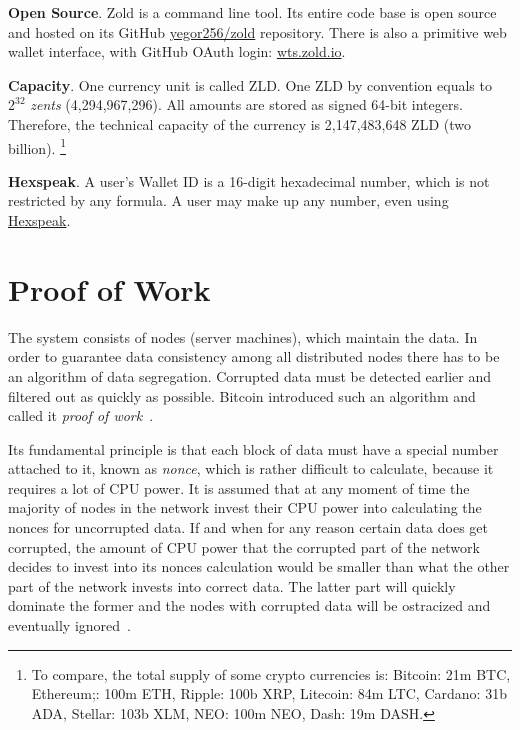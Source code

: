 \documentclass[11pt,oneside]{article}
\begin{document}
\textbf{Open Source}.
Zold is a command line tool. Its entire code base is open source
and hosted on its GitHub \href{https://github.com/yegor256/zold}{yegor256/zold}
repository. There is also a primitive web wallet interface, with
GitHub OAuth login: \href{https://wts.zold.io}{wts.zold.io}.

\textbf{Capacity}.
One currency unit is called ZLD.
One ZLD by convention equals to $2^{32}$ \emph{zents} (4,294,967,296).
All amounts are stored as signed 64-bit integers.
Therefore, the technical capacity of the currency is 2,147,483,648 ZLD (two billion).%
\footnote{%
  To compare, the total supply of some crypto currencies is:
  Bitcoin: 21m BTC,
  Ethereum;: 100m ETH,
  Ripple: 100b XRP,
  Litecoin: 84m LTC,
  Cardano: 31b ADA,
  Stellar: 103b XLM,
  NEO: 100m NEO,
  Dash: 19m DASH.
}

\textbf{Hexspeak}.
A user's Wallet ID is a 16-digit hexadecimal number, which is not restricted by any formula.
A user may make up any number, even using
\href{https://en.wikipedia.org/wiki/Hexspeak}{Hexspeak}.

\section{Proof of Work}\label{sec:score}

The system consists of nodes (server machines), which maintain the data.
In order to guarantee data consistency among all distributed nodes
there has to be an algorithm of data segregation.
Corrupted data must be detected earlier and filtered out as quickly as possible.
Bitcoin introduced such an algorithm and called it \emph{proof of work}~\parencite{nakamoto2008}.

Its fundamental principle is that each block of data must have a special
number attached to it, known as \emph{nonce}, which is rather difficult to calculate,
because it requires a lot of CPU power. It is assumed that at any moment
of time the majority of nodes in the network invest their CPU power into
calculating the nonces for uncorrupted data. If and when for any reason
certain data does get corrupted, the amount of CPU power that the corrupted part of the network
decides to invest into its nonces calculation would be smaller than what
the other part of the network invests into correct data. The latter part
will quickly dominate the former and the nodes with corrupted data will
be ostracized and eventually ignored~\parencite{nakamoto2008}.
\end{document}
